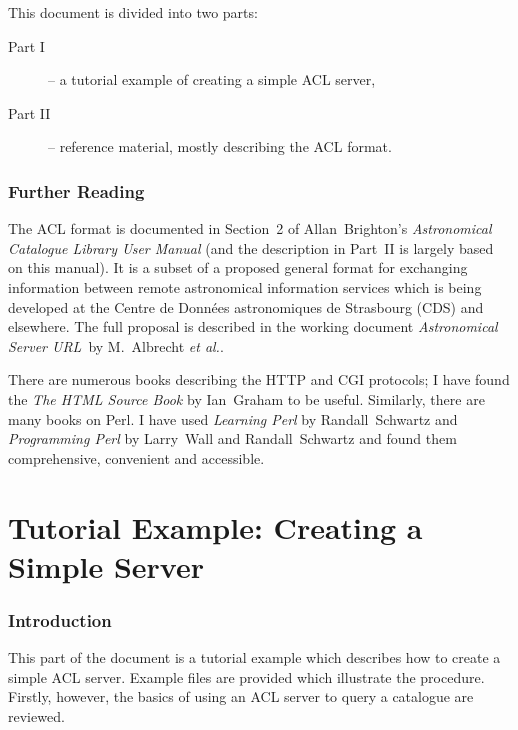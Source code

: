 \documentclass[twoside,11pt]{article}
\newcommand{\stardocinitials}  {SSN}
\newcommand{\stardocnumber}    {75.1}
\newcommand{\stardocname}{\stardocinitials /\stardocnumber}
\newcommand{\xlabel}[1]{}
\renewcommand{\_}{\texttt{\symbol{95}}}
\begin{document}
This document is divided into two parts:

\begin{description}

  \item[{\rm Part I}] -- a tutorial example of creating a simple ACL
   server,

  \item[{\rm Part II}] -- reference material, mostly describing the
   ACL format.

\end{description}


\section{\xlabel{FURTHER}\label{FURTHER}Further Reading}

The ACL format is documented in Section~2 of Allan~Brighton's {\it
Astronomical Catalogue Library User Manual}\/\cite{BRIGHTON98} (and the
description in Part~II is largely based on this manual).  It is a
subset of a proposed general format for exchanging information between
remote astronomical information services which is being developed at the
Centre de Donn\'{e}es astronomiques de Strasbourg (CDS) and elsewhere.
The full proposal is described in the working document {\it Astronomical
Server URL}\, by M.~Albrecht {\it et al.}\cite{SERVERURL}.

There are numerous books describing the HTTP and CGI protocols; I
have found the {\it The HTML Source Book}\/ by Ian~Graham\cite{GRAHAM95}
to be useful.  Similarly, there are many books on Perl.  I have used
{\it Learning Perl}\/ by  Randall~Schwartz\cite{SCHWARTZ93} and {\it
Programming Perl}\/ by Larry~Wall and Randall~Schwartz\cite{WALL91} and
found them comprehensive, convenient and accessible.

\cleardoublepage
\markboth{\stardocname}{\stardocname}
\part{Tutorial Example: Creating a Simple Server}
\markboth{\stardocname}{\stardocname}
\section{\xlabel{INTRO_T}\label{INTRO_T}Introduction}

This part of the document is a tutorial example which describes how to
create a simple ACL server.  Example files are provided which illustrate
the procedure.  Firstly, however, the basics of using an ACL server to
query a catalogue are reviewed.
\end{document}
